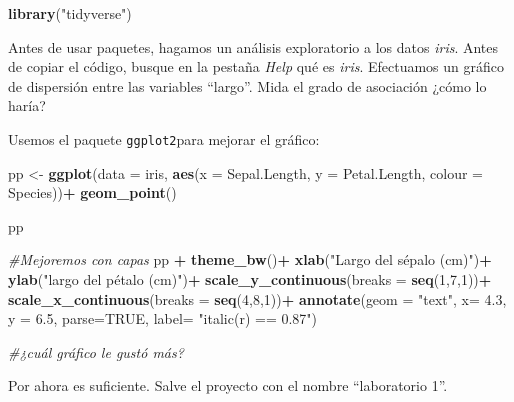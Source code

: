 \documentclass[
]{article}
\newenvironment{Shaded}{\begin{snugshade}}{\end{snugshade}}
\newcommand{\CommentTok}[1]{\textcolor[rgb]{0.56,0.35,0.01}{\textit{#1}}}
\newcommand{\DataTypeTok}[1]{\textcolor[rgb]{0.13,0.29,0.53}{#1}}
\newcommand{\DecValTok}[1]{\textcolor[rgb]{0.00,0.00,0.81}{#1}}
\newcommand{\FloatTok}[1]{\textcolor[rgb]{0.00,0.00,0.81}{#1}}
\newcommand{\KeywordTok}[1]{\textcolor[rgb]{0.13,0.29,0.53}{\textbf{#1}}}
\newcommand{\NormalTok}[1]{#1}
\newcommand{\OperatorTok}[1]{\textcolor[rgb]{0.81,0.36,0.00}{\textbf{#1}}}
\newcommand{\OtherTok}[1]{\textcolor[rgb]{0.56,0.35,0.01}{#1}}
\newcommand{\StringTok}[1]{\textcolor[rgb]{0.31,0.60,0.02}{#1}}
\begin{document}
\begin{Shaded}
\begin{Highlighting}[]
\KeywordTok{library}\NormalTok{(}\StringTok{"tidyverse"}\NormalTok{)}
\end{Highlighting}
\end{Shaded}

Antes de usar paquetes, hagamos un análisis exploratorio a los datos
\emph{iris}. Antes de copiar el código, busque en la pestaña \emph{Help}
qué es \emph{iris}. Efectuamos un gráfico de dispersión entre las
variables ``largo''. Mida el grado de asociación ¿cómo lo haría?

\begin{Shaded}
\end{Shaded}

Usemos el paquete \texttt{ggplot2}para mejorar el gráfico:

\begin{Shaded}
\begin{Highlighting}[]
\NormalTok{pp <-}\StringTok{ }\KeywordTok{ggplot}\NormalTok{(}\DataTypeTok{data =}\NormalTok{ iris, }\KeywordTok{aes}\NormalTok{(}\DataTypeTok{x =}\NormalTok{ Sepal.Length, }\DataTypeTok{y =}\NormalTok{ Petal.Length, }\DataTypeTok{colour =}\NormalTok{ Species))}\OperatorTok{+}
\StringTok{      }\KeywordTok{geom_point}\NormalTok{()}
  
\NormalTok{pp  }
  
\CommentTok{#Mejoremos con capas}
\NormalTok{pp }\OperatorTok{+}\StringTok{  }\KeywordTok{theme_bw}\NormalTok{()}\OperatorTok{+}
\StringTok{      }\KeywordTok{xlab}\NormalTok{(}\StringTok{"Largo del sépalo (cm)"}\NormalTok{)}\OperatorTok{+}
\StringTok{      }\KeywordTok{ylab}\NormalTok{(}\StringTok{"largo del pétalo (cm)"}\NormalTok{)}\OperatorTok{+}
\StringTok{      }\KeywordTok{scale_y_continuous}\NormalTok{(}\DataTypeTok{breaks =} \KeywordTok{seq}\NormalTok{(}\DecValTok{1}\NormalTok{,}\DecValTok{7}\NormalTok{,}\DecValTok{1}\NormalTok{))}\OperatorTok{+}
\StringTok{      }\KeywordTok{scale_x_continuous}\NormalTok{(}\DataTypeTok{breaks =} \KeywordTok{seq}\NormalTok{(}\DecValTok{4}\NormalTok{,}\DecValTok{8}\NormalTok{,}\DecValTok{1}\NormalTok{))}\OperatorTok{+}
\StringTok{      }\KeywordTok{annotate}\NormalTok{(}\DataTypeTok{geom =} \StringTok{"text"}\NormalTok{, }\DataTypeTok{x=} \FloatTok{4.3}\NormalTok{, }\DataTypeTok{y =} \FloatTok{6.5}\NormalTok{, }\DataTypeTok{parse=}\OtherTok{TRUE}\NormalTok{, }\DataTypeTok{label=} \StringTok{"italic(r) == 0.87"}\NormalTok{)}
      
\CommentTok{#¿cuál gráfico le gustó más? }
\end{Highlighting}
\end{Shaded}

Por ahora es suficiente. Salve el proyecto con el nombre ``laboratorio
1''.
\end{document}
